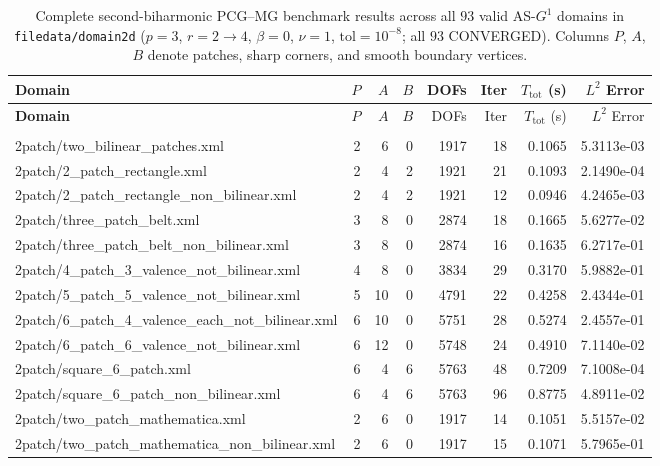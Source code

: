 \documentclass[11pt,a4paper]{article}
\begin{document}
\clearpage
\footnotesize
\setlength{\tabcolsep}{3.5pt}
\begin{longtable}{>{\ttfamily\scriptsize\raggedright\arraybackslash}p{8.4cm}rrrrrrr}
\caption{Complete second-biharmonic PCG--MG benchmark results across all $93$ valid AS-$G^1$ domains in \texttt{filedata/domain2d} ($p=3$, $r=2\to 4$, $\beta=0$, $\nu=1$, $\mathrm{tol}=10^{-8}$; all $93$ CONVERGED). Columns $P$, $A$, $B$ denote patches, sharp corners, and smooth boundary vertices.}
\label{tab:all93} \\
\toprule
\normalfont\bfseries Domain & $P$ & $A$ & $B$ & DOFs & Iter & $T_{\mathrm{tot}}$ (s) & $L^2$ Error \\
\midrule
\endfirsthead
\toprule
\normalfont\bfseries Domain & $P$ & $A$ & $B$ & DOFs & Iter & $T_{\mathrm{tot}}$ (s) & $L^2$ Error \\
\midrule
\endhead
\midrule
\multicolumn{8}{r}{\small\itshape Continued on next page} \\
\endfoot
\bottomrule
\endlastfoot
2patch/two\_bilinear\_patches.xml & 2 & 6 & 0 & 1917 & 18 & 0.1065 & 5.3113e-03 \\
2patch/2\_patch\_rectangle.xml & 2 & 4 & 2 & 1921 & 21 & 0.1093 & 2.1490e-04 \\
2patch/2\_patch\_rectangle\_non\_bilinear.xml & 2 & 4 & 2 & 1921 & 12 & 0.0946 & 4.2465e-03 \\
2patch/three\_patch\_belt.xml & 3 & 8 & 0 & 2874 & 18 & 0.1665 & 5.6277e-02 \\
2patch/three\_patch\_belt\_non\_bilinear.xml & 3 & 8 & 0 & 2874 & 16 & 0.1635 & 6.2717e-01 \\
2patch/4\_patch\_3\_valence\_not\_bilinear.xml & 4 & 8 & 0 & 3834 & 29 & 0.3170 & 5.9882e-01 \\
2patch/5\_patch\_5\_valence\_not\_bilinear.xml & 5 & 10 & 0 & 4791 & 22 & 0.4258 & 2.4344e-01 \\
2patch/6\_patch\_4\_valence\_each\_not\_bilinear.xml & 6 & 10 & 0 & 5751 & 28 & 0.5274 & 2.4557e-01 \\
2patch/6\_patch\_6\_valence\_not\_bilinear.xml & 6 & 12 & 0 & 5748 & 24 & 0.4910 & 7.1140e-02 \\
2patch/square\_6\_patch.xml & 6 & 4 & 6 & 5763 & 48 & 0.7209 & 7.1008e-04 \\
2patch/square\_6\_patch\_non\_bilinear.xml & 6 & 4 & 6 & 5763 & 96 & 0.8775 & 4.8911e-02 \\
2patch/two\_patch\_mathematica.xml & 2 & 6 & 0 & 1917 & 14 & 0.1051 & 5.5157e-02 \\
2patch/two\_patch\_mathematica\_non\_bilinear.xml & 2 & 6 & 0 & 1917 & 15 & 0.1071 & 5.7965e-01 \\

\end{longtable}
\end{document}
